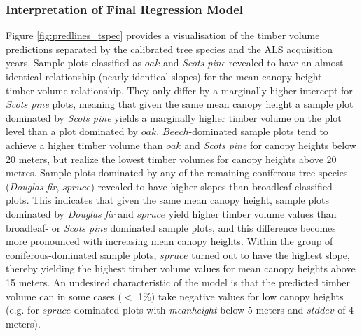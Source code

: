 \subsubsection*{Interpretation of Final Regression Model}
\label{sec:prop_regmod_final}
Figure \ref{fig:predlines_tspec} provides a visualisation of the timber volume predictions separated by the calibrated tree species and the ALS acquisition years. Sample plots classified as $oak$ and \textit{Scots pine} revealed to have an almost identical relationship (nearly identical slopes) for the mean canopy height - timber volume relationship. They only differ by a marginally higher intercept for \textit{Scots pine} plots, meaning that given the same mean canopy height a sample plot dominated by \textit{Scots pine} yields a marginally higher timber volume on the plot level than a plot dominated by $oak$. $Beech$-dominated sample plots tend to achieve a higher timber volume than $oak$ and \textit{Scots pine} for canopy heights below 20 meters, but realize the lowest timber volumes for canopy heights above 20 metres. Sample plots dominated by any of the remaining coniferous tree species (\textit{Douglas fir}, $spruce$) revealed to have higher slopes than broadleaf classified plots. This indicates that given the same mean canopy height, sample plots dominated by \textit{Douglas fir} and $spruce$ yield higher timber volume values than broadleaf- or \textit{Scots pine} dominated sample plots, and this difference becomes more pronounced with increasing mean canopy heights. Within the group of coniferous-dominated sample plots, $spruce$ turned out to have the highest slope, thereby yielding the highest timber volume values for mean canopy heights above 15 meters. An undesired characteristic of the model is that the predicted timber volume can in some cases ($<$ 1\%) take negative values for low canopy heights (e.g. for $spruce$-dominated plots with \textit{meanheight} below 5 meters and $stddev$ of 4 meters). 


